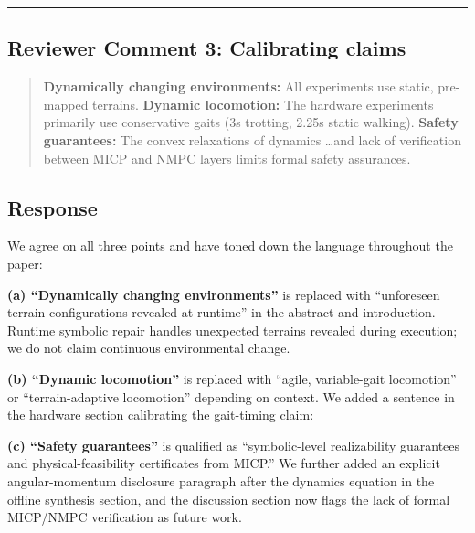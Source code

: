 \noindent\rule{17cm}{2.0pt}

\subsection{Reviewer Comment 3: Calibrating claims}
\begin{mdframed}
\begin{quote}
\textbf{Dynamically changing environments:} All experiments use static, pre-mapped terrains. \textbf{Dynamic locomotion:} The hardware experiments primarily use conservative gaits (3s trotting, 2.25s static walking). \textbf{Safety guarantees:} The convex relaxations of dynamics \ldots and lack of verification between MICP and NMPC layers limits formal safety assurances.
\end{quote}
\end{mdframed}

\subsection{Response}
We agree on all three points and have toned down the language throughout the paper:

\textbf{(a) ``Dynamically changing environments''} is replaced with ``unforeseen terrain configurations revealed at runtime'' in the abstract and introduction. Runtime symbolic repair handles unexpected terrains revealed during execution; we do not claim continuous environmental change.

\textbf{(b) ``Dynamic locomotion''} is replaced with ``agile, variable-gait locomotion'' or ``terrain-adaptive locomotion'' depending on context. We added a sentence in the hardware section calibrating the gait-timing claim:

\textit{}

\textbf{(c) ``Safety guarantees''} is qualified as ``symbolic-level realizability guarantees and physical-feasibility certificates from MICP.'' We further added an explicit angular-momentum disclosure paragraph after the dynamics equation in the offline synthesis section, and the discussion section now flags the lack of formal MICP/NMPC verification as future work.

